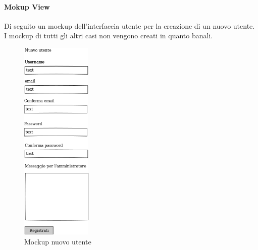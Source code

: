 \paragraph{Mokup View}
Di seguito un mockup dell'interfaccia utente per la creazione di un nuovo utente.
I mockup di tutti gli altri casi non vengono creati in quanto banali.
\begin{figure}[H]
\centering
\includegraphics[width=0.3\textwidth]{images/mockup_nuovo_utente.png}
\caption{Mockup nuovo utente}
\end{figure}




